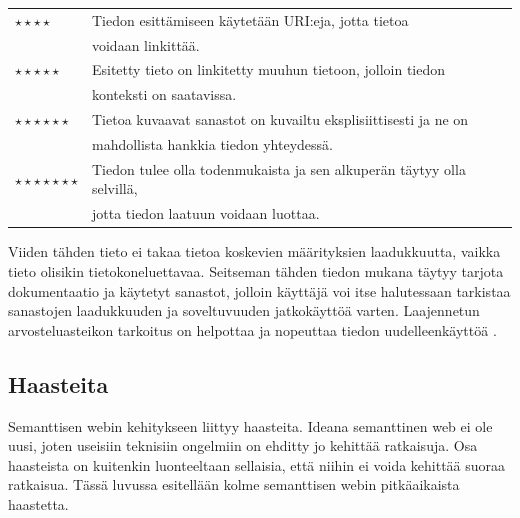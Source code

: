 \documentclass[finnish, 12pt, a4paper, elec, utf8, pdfa, online]{aaltothesis}
\begin{document}
{\begin{tabular}{ll}
$\star\star\star\star$      & Tiedon esittämiseen käytetään URI:eja, jotta tietoa \\
\vspace*{0.2cm}             & voidaan linkittää. \\
$\star\star\star\star\star$ & Esitetty tieto on linkitetty muuhun tietoon, jolloin tiedon \\        \vspace*{0.5cm}             & konteksti on saatavissa. \\
$\star\star\star\star\star\star$     & Tietoa kuvaavat sanastot on kuvailtu eksplisiittisesti ja ne on\\   \vspace*{0.2cm}               & mahdollista hankkia tiedon yhteydessä. \\
$\star\star\star\star\star\star\star$   & Tiedon tulee olla todenmukaista ja sen alkuperän täytyy olla selvillä, \\                & jotta tiedon laatuun voidaan luottaa. \\ %
\end{tabular}

Viiden tähden tieto ei takaa tietoa koskevien määrityksien laadukkuutta, vaikka tieto olisikin tietokoneluettavaa. Seitseman tähden tiedon mukana täytyy tarjota dokumentaatio ja käytetyt sanastot, jolloin käyttäjä voi itse halutessaan tarkistaa sanastojen laadukkuuden ja soveltuvuuden jatkokäyttöä varten. Laajennetun arvosteluasteikon tarkoitus on helpottaa ja nopeuttaa tiedon uudelleenkäyttöä \cite{SeCo_stars}.


\subsection{Haasteita}
Semanttisen webin kehitykseen liittyy haasteita. Ideana semanttinen web ei ole uusi, joten useisiin teknisiin ongelmiin on ehditty jo kehittää ratkaisuja. Osa haasteista on kuitenkin luonteeltaan sellaisia, että niihin ei voida kehittää suoraa ratkaisua. Tässä luvussa esitellään kolme semanttisen webin pitkäaikaista haastetta.


}
\end{document}
